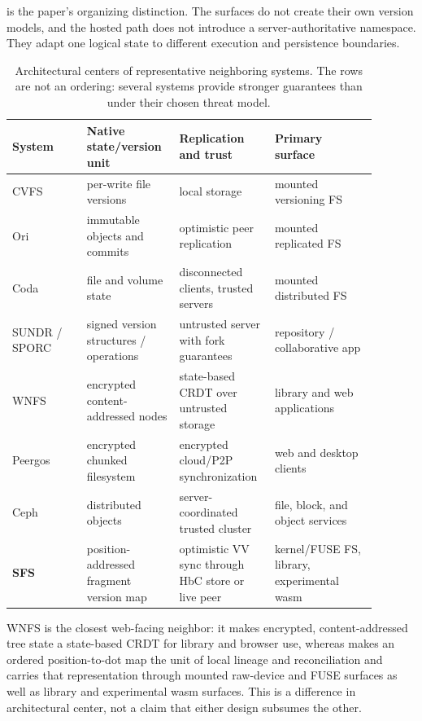  is the paper's organizing distinction.  The surfaces
do not create their own version models, and the hosted path does not introduce
a server-authoritative namespace.  They adapt one logical state to different
execution and persistence boundaries.

\begin{table}[t]
  \centering
  \small
  \setlength{\tabcolsep}{4pt}
  \caption{Architectural centers of representative neighboring systems.  The
    rows are not an ordering: several systems provide stronger guarantees than
    \sfs{} under their chosen threat model.}
  \label{tab:positioning}
  \begin{tabular}{@{}p{0.19\linewidth}p{0.22\linewidth}p{0.22\linewidth}p{0.26\linewidth}@{}}
    \toprule
    System & Native state/version unit & Replication and trust & Primary surface \\
    \midrule
    CVFS~\citep{Soules2003CVFS} & per-write file versions & local storage & mounted versioning FS \\
    Ori~\citep{Mashtizadeh2013Ori} & immutable objects and commits & optimistic peer replication & mounted replicated FS \\
    Coda~\citep{Kistler1992Coda} & file and volume state & disconnected clients, trusted servers & mounted distributed FS \\
    \shortstack[l]{SUNDR / SPORC\\\citep{Li2004SUNDR,Feldman2010SPORC}} & signed version structures / operations & untrusted server with fork guarantees & repository / collaborative app \\
    WNFS~\citep{WNFSspec} & encrypted content-addressed nodes & state-based CRDT over untrusted storage & library and web applications \\
    Peergos~\citep{Peergos} & encrypted chunked filesystem & encrypted cloud/P2P synchronization & web and desktop clients \\
    Ceph~\citep{Weil2006Ceph} & distributed objects & server-coordinated trusted cluster & file, block, and object services \\
    \midrule
    \textbf{SFS} & position-addressed fragment version map & optimistic VV sync through HbC store or live peer & kernel/FUSE FS, library, experimental wasm \\
    \bottomrule
  \end{tabular}
\end{table}

WNFS is the closest web-facing neighbor: it makes encrypted,
content-addressed tree state a state-based CRDT for library and browser use,
whereas \sfs{} makes an ordered position-to-dot map the unit of local lineage
and reconciliation and carries that representation through mounted raw-device
and FUSE surfaces as well as library and experimental wasm surfaces.  This is
a difference in architectural center, not a claim that either design subsumes
the other.

